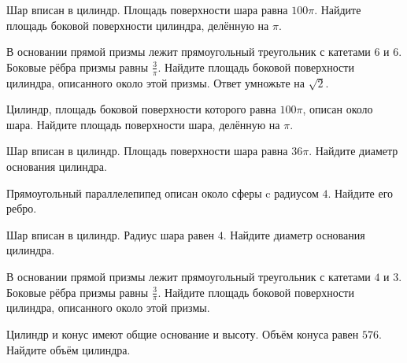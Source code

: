 \documentclass[4apaper]{article}
\begin{document}
\begin{taskBN}{42}
Шар вписан в цилиндр. Площадь поверхности шара равна $100\pi$. Найдите площадь боковой поверхности цилиндра, делённую на $\pi$.
\end{taskBN}

\begin{taskBN}{43}
В основании прямой призмы лежит прямоугольный треугольник с катетами $6$ и $6$. Боковые рёбра призмы равны $\frac{3}{\pi}$. Найдите площадь боковой поверхности цилиндра, описанного около этой призмы. Ответ умножьте на $\sqrt{2}$.
\end{taskBN}

\begin{taskBN}{44}
 Цилиндр, площадь боковой поверхности которого равна $100\pi$, описан около шара. Найдите площадь поверхности шара, делённую на $\pi$.
\end{taskBN}

\begin{taskBN}{45}
Шар вписан в цилиндр. Площадь поверхности шара равна $36\pi$. Найдите диаметр основания цилиндра.
\end{taskBN}

\begin{taskBN}{46}
Прямоугольный параллелепипед описан около сферы c радиусом $4$. Найдите его ребро. 
\end{taskBN}

\begin{taskBN}{47}
Шар вписан в цилиндр. Радиус шара равен $4$. Найдите диаметр основания цилиндра.
\end{taskBN}

\begin{taskBN}{48}
В основании прямой призмы лежит прямоугольный треугольник с катетами $4$ и $3$. Боковые рёбра призмы равны $\frac{3}{\pi}$. Найдите площадь боковой поверхности цилиндра, описанного около этой призмы.
\end{taskBN}

\begin{taskBN}{49}
Цилиндр и конус имеют общие основание и высоту. Объём конуса равен $576$. Найдите объём цилиндра.
\end{taskBN}
\end{document}
